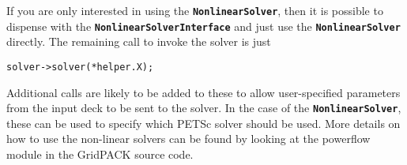 If you are only interested in using the \texttt{\textbf{NonlinearSolver}}, then it is possible to dispense with the \texttt{\textbf{NonlinearSolverInterface}} and just use the \texttt{\textbf{NonlinearSolver}} directly. The remaining call to invoke the solver is just

{
\color{red}
\begin{Verbatim}[fontseries=b]
  solver->solver(*helper.X);
\end{Verbatim}
}

Additional calls are likely to be added to these to allow user-specified parameters from the input deck to be sent to the solver. In the case of the \texttt{\textbf{NonlinearSolver}}, these can be used to specify which PETSc solver should be used. More details on how to use the non-linear solvers can be found by looking at the powerflow module in the GridPACK source code.
